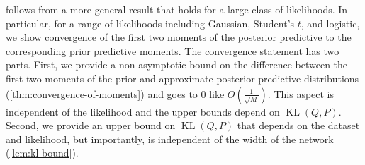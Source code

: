 \documentclass[twoside]{article}
\renewcommand{\P}{\mathbb{P}}
\newcommand{\Q}{\mathbb{Q}}
\renewcommand{\Q}{\ensuremath{Q}}
\renewcommand{\P}{\ensuremath{P}}
\newcommand{\KL}{\operatorname{KL}}
\theoremstyle{theoremstyle}
\begin{document}
 follows from a more general result that holds for a large class of likelihoods. In particular, for a range of likelihoods including Gaussian, Student's $t$, and logistic, we show convergence of the first two moments of the posterior predictive to the corresponding prior predictive moments. The convergence statement has two parts. First, we provide a non-asymptotic bound on the difference between the first two moments of the prior and approximate posterior predictive distributions (\cref{thm:convergence-of-moments}) and goes to $0$ like $O(\tfrac1{\sqrt{M}})$. This aspect is independent of the likelihood and the upper bounds depend on $\KL(\Q,\P)$. Second, we provide an upper bound on $\KL(\Q,\P)$ that depends on the dataset and likelihood, but importantly, is independent of the width of the network (\cref{lem:kl-bound}).


\end{document}
